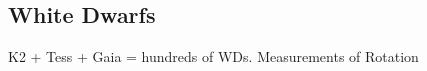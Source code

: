 {\color{red} \subsection{White Dwarfs}}
K2 + Tess + Gaia = hundreds of WDs. Measurements of Rotation